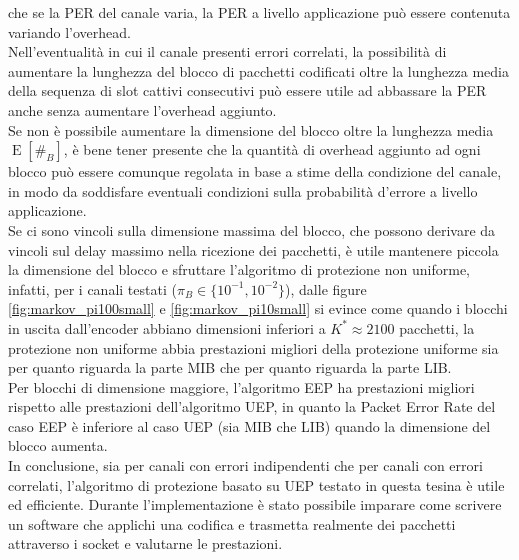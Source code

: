 \documentclass[italian, a4paper, 12pt]{article}
\newcommand{\E}[1]{\operatorname{E}\left[#1\right]}
\newcommand{\EnB}{\E{\#_B}}
\begin{document}
che se la PER del canale varia, la PER a livello applicazione può essere contenuta
variando l'overhead.\\
Nell'eventualità in cui il canale presenti errori correlati,
la possibilità di aumentare la lunghezza del blocco di pacchetti codificati oltre la lunghezza media della sequenza
di slot cattivi consecutivi può essere utile ad abbassare la PER anche senza aumentare l'overhead aggiunto.\\
Se non è possibile aumentare la dimensione del blocco oltre la lunghezza media $\EnB$, è bene
tener presente che la quantità di overhead aggiunto ad ogni blocco può essere comunque
regolata in base a stime della condizione del canale, in modo da soddisfare eventuali condizioni
sulla probabilità d'errore a livello applicazione.\\
Se ci sono vincoli sulla dimensione massima del blocco, che possono derivare
da vincoli sul delay massimo nella ricezione dei pacchetti, è utile mantenere
piccola la dimensione del blocco e sfruttare l'algoritmo di protezione non uniforme, infatti,
per i canali testati ($\pi_B \in\{10^{-1},10^{-2}\}$), dalle figure \ref{fig:markov_pi100small}
e \ref{fig:markov_pi10small} si evince come quando i blocchi
in uscita dall'encoder abbiano dimensioni inferiori a $K^* \approx 2100$ pacchetti,
la protezione non uniforme abbia prestazioni migliori della protezione uniforme sia per quanto riguarda la
parte MIB che per quanto riguarda la parte LIB.\\
Per blocchi di dimensione maggiore, l'algoritmo EEP ha prestazioni
migliori rispetto alle prestazioni dell'algoritmo UEP, in quanto la Packet
Error Rate del caso EEP è inferiore al caso UEP (sia MIB che LIB) quando la dimensione del blocco aumenta.\\
In conclusione, sia per canali con errori indipendenti che per canali con errori correlati, l'algoritmo di protezione basato su UEP testato in questa tesina è utile ed efficiente. Durante l'implementazione è stato possibile imparare come scrivere un software che applichi una codifica e trasmetta realmente dei pacchetti attraverso i socket e valutarne le prestazioni.

\printbibliography[heading=bibnumbered, title=Bibliografia]
\end{document}
